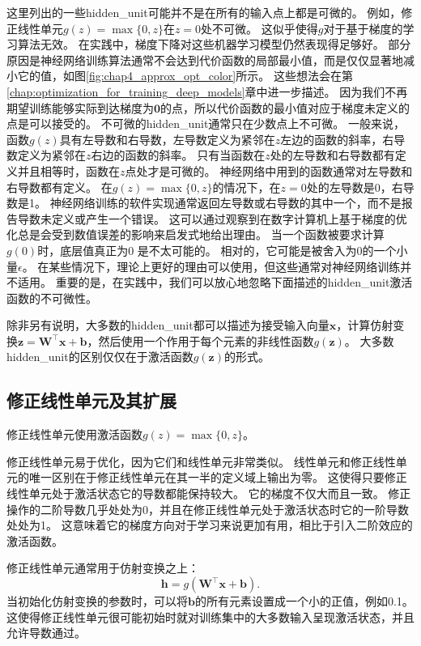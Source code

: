 这里列出的一些\gls{hidden_unit}可能并不是在所有的输入点上都是可微的。
例如，修正线性单元$g(z)=\max\{0, z\}$在$z=0$处不可微。
这似乎使得$g$对于基于梯度的学习算法无效。
在实践中，梯度下降对这些机器学习模型仍然表现得足够好。
部分原因是神经网络训练算法通常不会达到代价函数的局部最小值，而是仅仅显著地减小它的值，如图\ref{fig:chap4_approx_opt_color}所示。
这些想法会在第\ref{chap:optimization_for_training_deep_models}章中进一步描述。
因为我们不再期望训练能够实际到达梯度为$\bm{0}$的点，所以代价函数的最小值对应于梯度未定义的点是可以接受的。
不可微的\gls{hidden_unit}通常只在少数点上不可微。
一般来说，函数$g(z)$具有左导数和右导数，左导数定义为紧邻在$z$左边的函数的斜率，右导数定义为紧邻在$z$右边的函数的斜率。
只有当函数在$z$处的左导数和右导数都有定义并且相等时，函数在$z$点处才是可微的。
神经网络中用到的函数通常对左导数和右导数都有定义。
在$g(z)=\max\{0,z\}$的情况下，在$z=0$处的左导数是0，右导数是1。
神经网络训练的软件实现通常返回左导数或右导数的其中一个，而不是报告导数未定义或产生一个错误。
这可以通过观察到在数字计算机上基于梯度的优化总是会受到数值误差的影响来启发式地给出理由。
当一个函数被要求计算$g(0)$时，底层值真正为0 是不太可能的。
相对的，它可能是被舍入为0的一个小量$\epsilon$。
在某些情况下，理论上更好的理由可以使用，但这些通常对神经网络训练并不适用。
重要的是，在实践中，我们可以放心地忽略下面描述的\gls{hidden_unit}激活函数的不可微性。


除非另有说明，大多数的\gls{hidden_unit}都可以描述为接受输入向量$\bm{x}$，计算仿射变换$\bm{z}=\bm{W}^\top \bm{x}+\bm{b}$，然后使用一个作用于每个元素的非线性函数$g(\bm{z})$。
大多数\gls{hidden_unit}的区别仅仅在于激活函数$g(\bm{z})$的形式。

\subsection{修正线性单元及其扩展}
\label{sec:rectified_linear_units_and_their_generalizations}

修正线性单元使用激活函数$g(z)=\max\{0, z\}$。

修正线性单元易于优化，因为它们和线性单元非常类似。
线性单元和修正线性单元的唯一区别在于修正线性单元在其一半的定义域上输出为零。
这使得只要修正线性单元处于激活状态它的导数都能保持较大。
它的梯度不仅大而且一致。
修正操作的二阶导数几乎处处为0，并且在修正线性单元处于激活状态时它的一阶导数处处为1。
这意味着它的梯度方向对于学习来说更加有用，相比于引入二阶效应的激活函数。

修正线性单元通常用于仿射变换之上：
\begin{equation}
\bm{h} = g(\bm{W}^\top \bm{x} + \bm{b}).
\end{equation}
当初始化仿射变换的参数时，可以将$\bm{b}$的所有元素设置成一个小的正值，例如0.1。
这使得修正线性单元很可能初始时就对训练集中的大多数输入呈现激活状态，并且允许导数通过。

